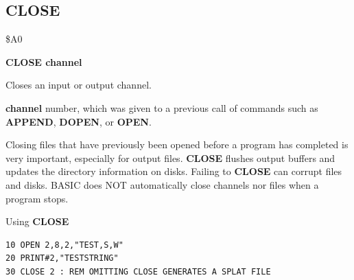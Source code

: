 
\newpage
\subsection{CLOSE}
\begin{description}[leftmargin=2cm,style=nextline]
\item [Token:] \$A0
\item [Format:] {\bf CLOSE channel}
\item [Usage:] Closes an input or output channel.

               {\bf channel} number, which was given to a previous
               call of commands such as {\bf APPEND}, {\bf DOPEN}, or {\bf OPEN}.

\item [Remarks:] Closing files that have previously been opened
               before a program has completed is
               very important, especially for output files.
               {\bf CLOSE} flushes output buffers and
               updates the directory information on disks.
               Failing to {\bf CLOSE} can corrupt files and disks.
               BASIC does NOT automatically close channels nor files
               when a program stops.

\item [Example:] Using {\bf CLOSE}
\begin{tcolorbox}[colback=black,coltext=white]
\verbatimfont{\codefont}
\begin{verbatim}
10 OPEN 2,8,2,"TEST,S,W"
20 PRINT#2,"TESTSTRING"
30 CLOSE 2 : REM OMITTING CLOSE GENERATES A SPLAT FILE
\end{verbatim}
\end{tcolorbox}
\end{description}


\newpage
